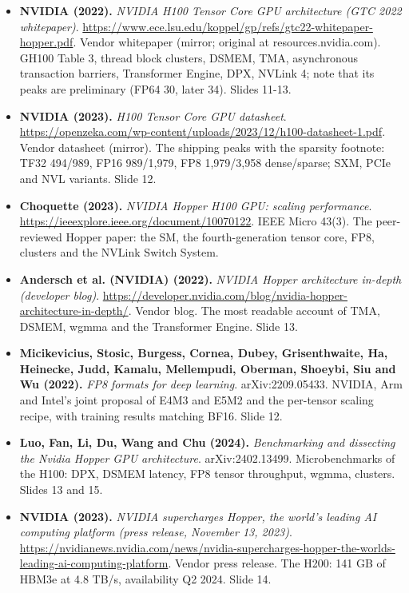 \documentclass[11pt,letterpaper]{article}
\begin{document}
\begin{itemize}[leftmargin=1.2em,itemsep=3pt]\sloppy
\item \textbf{NVIDIA (2022).} \textit{NVIDIA H100 Tensor Core GPU architecture (GTC 2022 whitepaper)}. \url{https://www.ece.lsu.edu/koppel/gp/refs/gtc22-whitepaper-hopper.pdf}. Vendor whitepaper (mirror; original at resources.nvidia.com). GH100 Table 3, thread block clusters, DSMEM, TMA, asynchronous transaction barriers, Transformer Engine, DPX, NVLink 4; note that its peaks are preliminary (FP64 30, later 34). Slides 11-13.
\item \textbf{NVIDIA (2023).} \textit{H100 Tensor Core GPU datasheet}. \url{https://openzeka.com/wp-content/uploads/2023/12/h100-datasheet-1.pdf}. Vendor datasheet (mirror). The shipping peaks with the sparsity footnote: TF32 494/989, FP16 989/1,979, FP8 1,979/3,958 dense/sparse; SXM, PCIe and NVL variants. Slide 12.
\item \textbf{Choquette (2023).} \textit{NVIDIA Hopper H100 GPU: scaling performance}. \url{https://ieeexplore.ieee.org/document/10070122}. IEEE Micro 43(3). The peer-reviewed Hopper paper: the SM, the fourth-generation tensor core, FP8, clusters and the NVLink Switch System.
\item \textbf{Andersch et al. (NVIDIA) (2022).} \textit{NVIDIA Hopper architecture in-depth (developer blog)}. \url{https://developer.nvidia.com/blog/nvidia-hopper-architecture-in-depth/}. Vendor blog. The most readable account of TMA, DSMEM, wgmma and the Transformer Engine. Slide 13.
\item \textbf{Micikevicius, Stosic, Burgess, Cornea, Dubey, Grisenthwaite, Ha, Heinecke, Judd, Kamalu, Mellempudi, Oberman, Shoeybi, Siu and Wu (2022).} \textit{FP8 formats for deep learning}. arXiv:2209.05433. NVIDIA, Arm and Intel's joint proposal of E4M3 and E5M2 and the per-tensor scaling recipe, with training results matching BF16. Slide 12.
\item \textbf{Luo, Fan, Li, Du, Wang and Chu (2024).} \textit{Benchmarking and dissecting the Nvidia Hopper GPU architecture}. arXiv:2402.13499. Microbenchmarks of the H100: DPX, DSMEM latency, FP8 tensor throughput, wgmma, clusters. Slides 13 and 15.
\item \textbf{NVIDIA (2023).} \textit{NVIDIA supercharges Hopper, the world's leading AI computing platform (press release, November 13, 2023)}. \url{https://nvidianews.nvidia.com/news/nvidia-supercharges-hopper-the-worlds-leading-ai-computing-platform}. Vendor press release. The H200: 141 GB of HBM3e at 4.8 TB/s, availability Q2 2024. Slide 14.

\end{itemize}
\end{document}
